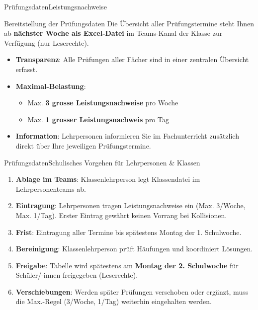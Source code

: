 \begin{frame}{Prüfungsdaten}{Leistungsnachweise}
    \begin{block}{\faFileExcel{} Bereitstellung der Prüfungsdaten}
        Die Übersicht aller Prüfungstermine steht Ihnen ab \textbf{nächster Woche als Excel-Datei} im Teams-Kanal der Klasse zur Verfügung (nur Leserechte).
    \end{block}
    
    \vspace{2mm}
    \begin{itemize}[<+->]
        \item[\faCalendarCheck] \textbf{Transparenz}: Alle Prüfungen aller Fächer sind in einer zentralen Übersicht erfasst.
        \item[\faExclamationTriangle] \textbf{Maximal-Belastung}: 
            \begin{itemize}
                \item Max. \textbf{3 grosse Leistungsnachweise} pro Woche
                \item Max. \textbf{1 grosser Leistungsnachweis} pro Tag
            \end{itemize}
        \item[\faBullhorn] \textbf{Information}: Lehrpersonen informieren Sie im Fachunterricht zusätzlich direkt über Ihre jeweiligen Prüfungstermine.
    \end{itemize}
\end{frame}

\begin{frame}{Prüfungsdaten}{Schulisches Vorgehen für Lehrpersonen \& Klassen}
    \small
    \begin{enumerate}[<+->]\setlength{\itemsep}{1pt}
        \item \textbf{Ablage im Teams}: Klassenlehrperson legt Klassendatei im Lehrpersonenteams ab.
        \item \textbf{Eintragung}: Lehrpersonen tragen Leistungsnachweise ein (Max. 3/Woche, Max. 1/Tag). Erster Eintrag gewährt keinen Vorrang bei Kollisionen.
        \item \textbf{Frist}: Eintragung aller Termine bis spätestens Montag der 1. Schulwoche.
        \item \textbf{Bereinigung}: Klassenlehrperson prüft Häufungen und koordiniert Lösungen.
        \item \textbf{Freigabe}: Tabelle wird spätestens am \textbf{Montag der 2. Schulwoche} für Schüler/-innen freigegeben (Leserechte).
        \item \textbf{Verschiebungen}: Werden später Prüfungen verschoben oder ergänzt, muss die Max.-Regel (3/Woche, 1/Tag) weiterhin eingehalten werden.
    \end{enumerate}
\end{frame}

